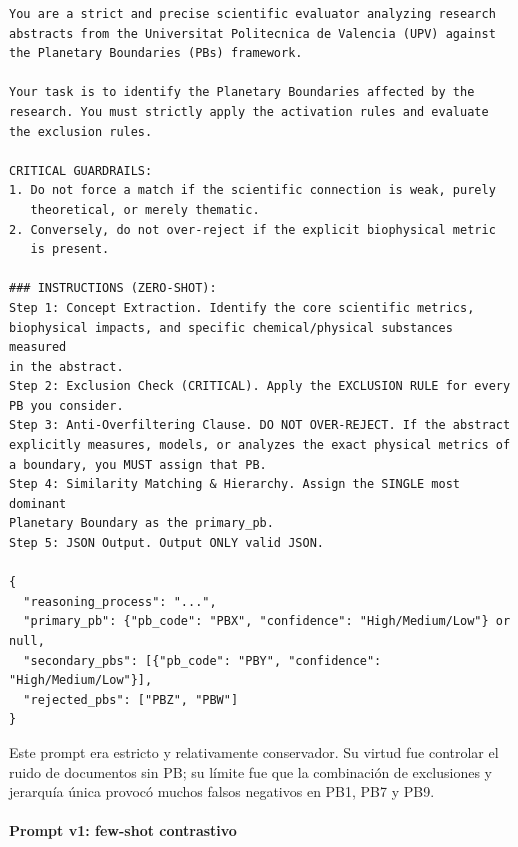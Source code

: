 {\footnotesize
\begin{verbatim}
You are a strict and precise scientific evaluator analyzing research
abstracts from the Universitat Politecnica de Valencia (UPV) against
the Planetary Boundaries (PBs) framework.

Your task is to identify the Planetary Boundaries affected by the
research. You must strictly apply the activation rules and evaluate
the exclusion rules.

CRITICAL GUARDRAILS:
1. Do not force a match if the scientific connection is weak, purely
   theoretical, or merely thematic.
2. Conversely, do not over-reject if the explicit biophysical metric
   is present.

### INSTRUCTIONS (ZERO-SHOT):
Step 1: Concept Extraction. Identify the core scientific metrics,
biophysical impacts, and specific chemical/physical substances measured
in the abstract.
Step 2: Exclusion Check (CRITICAL). Apply the EXCLUSION RULE for every
PB you consider.
Step 3: Anti-Overfiltering Clause. DO NOT OVER-REJECT. If the abstract
explicitly measures, models, or analyzes the exact physical metrics of
a boundary, you MUST assign that PB.
Step 4: Similarity Matching & Hierarchy. Assign the SINGLE most dominant
Planetary Boundary as the primary_pb.
Step 5: JSON Output. Output ONLY valid JSON.

{
  "reasoning_process": "...",
  "primary_pb": {"pb_code": "PBX", "confidence": "High/Medium/Low"} or null,
  "secondary_pbs": [{"pb_code": "PBY", "confidence": "High/Medium/Low"}],
  "rejected_pbs": ["PBZ", "PBW"]
}
\end{verbatim}
}

Este prompt era estricto y relativamente conservador. Su virtud fue controlar el ruido de documentos sin PB; su límite fue que la combinación de exclusiones y jerarquía única provocó muchos falsos negativos en PB1, PB7 y PB9.

\paragraph{Prompt v1: few-shot contrastivo}

